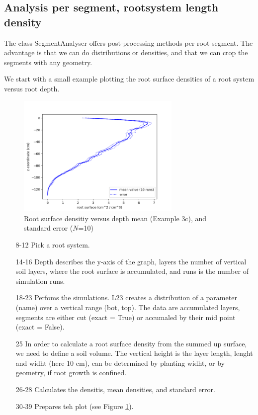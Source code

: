 \documentclass[a4paper]{article}
\begin{document}
\subsection{Analysis per segment, rootsystem length density}

The class SegmentAnalyser offers post-processing methods per root segment. The advantage is that we can do distributions or densities, and that we can crop the segments with any geometry. 

We start with a small example plotting the root surface densities of a root system versus root depth.



\begin{figure}
\centering
\includegraphics[width=0.7\textwidth]{example_3c.png}
\caption{Root surface densitiy versus depth mean (Example 3c), and standard error ($N$=10)} \label{fig:surface_density}
\end{figure}


\begin{itemize}

\item[8-12] Pick a root system.
\item[14-16] Depth describes the y-axis of the graph, layers the number of vertical soil layers, where the root surface is accumulated, and runs is the number of simulation runs. 
\item[18-23] Perfoms the simulations. L23 creates a distribution of a parameter (name) over a vertical range (bot, top). The data are accumulated layers, segments are either cut (exact = True) or accumaled by their mid point (exact = False). 
\item[25] In order to calculate a root surface density from the summed up surface, we need to define a soil volume. The vertical height is the layer length, lenght and widht (here 10 cm), can be determined by planting widht, or by geometry, if root growth is confined. 
\item[26-28] Calculates the densitis, mean densities, and standard error. 
\item[30-39] Prepares teh plot (see Figure \ref{fig:surface_density}).

\end{itemize}
\end{document}
